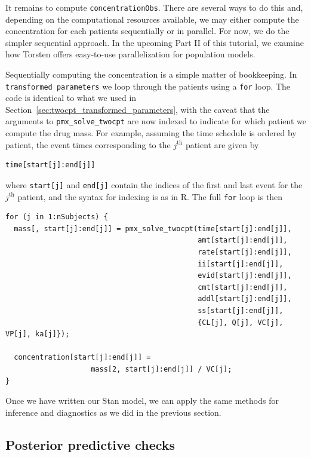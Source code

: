 It remains to compute \texttt{concentrationObs}.
There are several ways to do this and, depending on the computational resources available, we may either compute the concentration for each patients sequentially or in parallel.
For now, we do the simpler sequential approach.
In the upcoming Part II of this tutorial, we examine how Torsten offers easy-to-use parallelization  for population models.

Sequentially computing the concentration is a simple matter of bookkeeping.
In \texttt{transformed parameters} we loop through the patients using a \texttt{for} loop.
The code is identical to what we used in Section~\ref{sec:twocpt_transformed_parameters},
with the caveat that the arguments to \texttt{pmx\_solve\_twocpt} are now indexed to indicate for which patient we compute the drug mass.
For example, assuming the time schedule is ordered by patient, the event times corresponding to the $j^\mathrm{th}$ patient are given by
\begin{lstlisting}[style=stan, numbers=none]
time[start[j]:end[j]]
\end{lstlisting}
%
where \texttt{start[j]} and \texttt{end[j]} contain the indices of the first and last event for the $j^\mathrm{th}$ patient, and the syntax for indexing is as in R.
The full \texttt{for} loop is then
%
\begin{lstlisting}[style=stan, numbers=none]
for (j in 1:nSubjects) {
  mass[, start[j]:end[j]] = pmx_solve_twocpt(time[start[j]:end[j]],
                                             amt[start[j]:end[j]],
                                             rate[start[j]:end[j]],
                                             ii[start[j]:end[j]],
                                             evid[start[j]:end[j]],
                                             cmt[start[j]:end[j]],
                                             addl[start[j]:end[j]],
                                             ss[start[j]:end[j]],
                                             {CL[j], Q[j], VC[j], VP[j], ka[j]});

  concentration[start[j]:end[j]] = 
                    mass[2, start[j]:end[j]] / VC[j];
}
\end{lstlisting}

Once we have written our Stan model, we can apply the same methods for inference and diagnostics as we did in the previous section.

\subsection{Posterior predictive checks}

